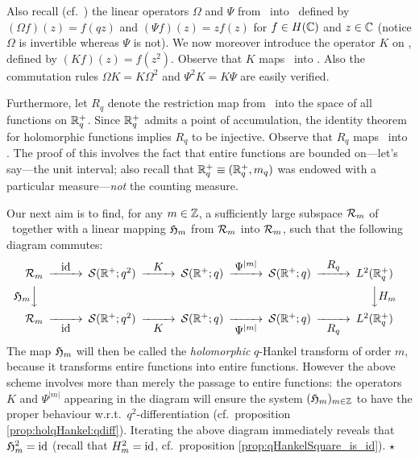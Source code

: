 Also recall (cf.\ \cite[\S 3.2]{Jeroen:QE2:haar}) the linear
operators $\Omega$ and $\Psi$ from \HC\ into \HC\ defined by
$(\Omega f)(z) = f(qz)$ and $(\Psi f)(z) = z f(z)$ for
$f\in H(\mathbb{C})$ and $z\in\mathbb{C}$
(notice $\Omega$ is invertible whereas $\Psi$ is not).
We now moreover introduce the operator $K$ on \HC, defined by
$(Kf)(z)=f(z^2)$. Observe that $K$ maps \Swqbis\ into \Swq\@.
Also the commutation rules $\Omega K = K\Omega^2$ and
$\Psi^2 K = K \Psi$ are easily verified.

Furthermore, let $R_q$ denote the restriction map from \HC\ into
the space of all functions on $\mathbb{R}_q^+$. Since $\mathbb{R}_q^+$ admits a
point of accumulation, the identity theorem for holomorphic functions
implies $R_q$ to be injective.
Observe that $R_q$ maps \Swq\ into \Ltwoq\@. The proof of this involves
the fact that entire functions are bounded on---let's say---the unit interval;
also recall that $\mathbb{R}_q^+ \equiv (\mathbb{R}_q^+,m_q)$ was endowed with a particular
measure---{\em not\/} the counting measure.



\begin{abs} \label{abs:holomorphic_qHankel}\rm
Our next aim is to find, for any $m\in\mathbb{Z}$, a sufficiently large subspace
${\mathcal R}_{m}$ of \Swqbis\ together with a linear mapping $\mathfrak{H}_{m}$ from ${\mathcal R}_{m}$
into ${\mathcal R}_{m}$, such that the following diagram commutes:
\begin{equation}\label{eq:diagram:holomorphic_qHankel}
\begin{CD}
  \holS{m} @>\id>>
  \Swqbis  @>{\textstyle K}>>
  \Swq     @>{\textstyle \Psi^{|m|}}>>
  \Swq     @>{\textstyle R_q}>>
  \Ltwoq \\
  @V{\textstyle\holH{m}}VV @. @. @. @VV{\textstyle H_m}V  \\
  \holS{m} @>>\id>
  \Swqbis  @>>{\textstyle K}>
  \Swq     @>>{\textstyle \Psi^{|m|}}>
  \Swq     @>>{\textstyle R_q}>
  \Ltwoq
\end{CD}
\end{equation}
The map $\mathfrak{H}_{m}$ will then be called the {\em holomorphic\/} $q$-Hankel transform of order $m$,
because it transforms entire functions into entire functions.
However the above scheme involves more than merely the passage to entire functions:
the operators $K$ and $\Psi^{|m|}$ appearing in the diagram will ensure
the system $(\mathfrak{H}_{m})_{m\in\mathbb{Z}}$ to have the proper behaviour w.r.t.\
$q^2$-differentiation (cf.\ proposition \ref{prop:holqHankel:qdiff}).
Iterating the above diagram immediately reveals that $\mathfrak{H}_{m}^2=\mbox{\rm id}$
(recall that $H_m^2=\mbox{\rm id}$, cf.\ proposition \ref{prop:qHankelSquare_is_id}).
\hfill $\star$
\end{abs}

